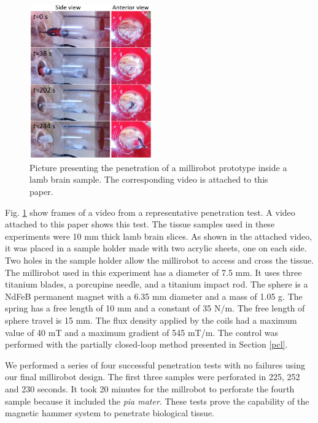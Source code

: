 \documentclass[letterpaper, 10 pt, journal, twoside]{ieeetran}
\begin{document}
\begin{figure}
	\centering
  \includegraphics[width=150pt]{brain_penetration.png}
  \caption{Picture presenting the penetration of a millirobot prototype inside a lamb brain sample. The corresponding video is attached to this paper.}
  \label{brain_penetration}
	\vspace{-1.5em}
\end{figure}

Fig. \ref{brain_penetration} show frames of a video from a representative penetration test. A video attached to this paper shows this test. The tissue samples used in these experiments were 10 mm thick lamb brain slices. As shown in the attached video, it was placed in a sample holder made with two acrylic sheets, one on each side. Two holes in the sample holder allow the millirobot to access and cross the tissue. The millirobot used in this experiment has a diameter of 7.5 mm. It uses three titanium blades, a porcupine needle, and a titanium impact rod. The sphere is a NdFeB permanent magnet with a 6.35 mm diameter and a mass of 1.05 g. The spring has a free length of 10 mm and a constant of 35 N/m. The free length of sphere travel is 15 mm. The flux density applied by the coils had a maximum value of 40 mT and a maximum gradient of 545 mT/m. The control was performed with the partially closed-loop method presented in Section \ref{pcl}.\par
We performed a series of four successful penetration tests with no failures using our final millirobot design. The first three samples were perforated in 225, 252 and 230 seconds. It took 20 minutes for the millrobot to perforate the fourth sample because it included the \emph{pia mater}. These tests prove the capability of the magnetic hammer system to penetrate biological tissue.
\vspace{-1em}
\end{document}
